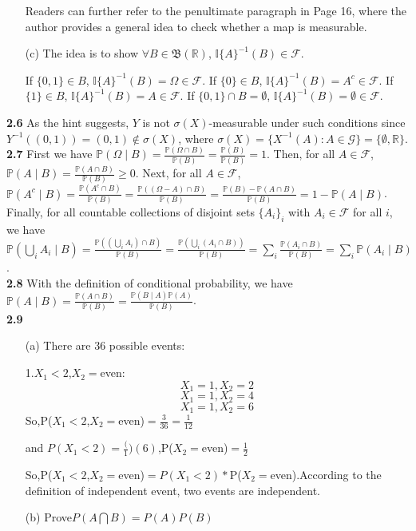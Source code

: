 \begin{enumerate}
    Readers can further refer to the penultimate paragraph in Page 16, where the author provides a general idea to check whether a map is measurable.

    \item[(c)] The idea is to show $\forall B \in \mathfrak{B}(\mathbb{R})$, $\mathbb{I}\{A\}^{-1}(B) \in \mathcal{F}$.

    If $\{0,1\} \in B$, $\mathbb{I}\{A\}^{-1}(B)=\Omega \in \mathcal{F}$. If $\{0\} \in B$, $\mathbb{I}\{A\}^{-1}(B)=A^c \in \mathcal{F}$. If $\{1\} \in B$, $\mathbb{I}\{A\}^{-1}(B)=A \in \mathcal{F}$. If $\{0,1\} \cap B = \emptyset$, $\mathbb{I}\{A\}^{-1}(B)=\emptyset \in \mathcal{F}$.
\end{enumerate}

\noindent\textbf{2.6}
As the hint suggests, $Y$ is not $\sigma(X)$-measurable under such conditions since $Y^{-1}((0, 1))=(0, 1) \notin \sigma(X)$, where $\sigma(X) = \{{X}^{-1}(A): A \in \mathcal{G}\} = \{\emptyset, \mathbb{R}\}$.\\

\noindent\textbf{2.7}
First we have $\mathbb{P}(\Omega \mid B) = \frac{\mathbb{P}(\Omega \cap B)}{\mathbb{P}(B)} = \frac{\mathbb{P}(B)}{\mathbb{P}(B)} = 1$. Then, for all $A \in \mathcal{F}$, $\mathbb{P}(A \mid B) = \frac{\mathbb{P}(A \cap B)}{\mathbb{P}(B)} \geq 0$. Next, for all $A \in \mathcal{F}$, $\mathbb{P}(A^c \mid B) = \frac{\mathbb{P}(A^c \cap B)}{\mathbb{P}(B)} = \frac{\mathbb{P}((\Omega - A) \cap B)}{\mathbb{P}(B)} = \frac{\mathbb{P}(B) - \mathbb{P}(A \cap B)}{\mathbb{P}(B)} = 1 - \mathbb{P}(A \mid B)$. Finally, for all countable collections of disjoint sets $\{A_i\}_i$ with $A_i \in \mathcal{F}$ for all $i$, we have $\mathbb{P}\left(\bigcup_{i} A_{i} \mid B\right) = \frac{\mathbb{P}((\bigcup_{i} A_{i}) \cap B)}{\mathbb{P}(B)} = \frac{\mathbb{P}(\bigcup_{i} (A_{i} \cap B))}{\mathbb{P}(B)} = \sum_{i} \frac{\mathbb{P}(A_{i} \cap B)}{\mathbb{P}(B)} = \sum_{i} \mathbb{P}(A_i \mid B)$. \\

\noindent\textbf{2.8}
With the definition of conditional probability, we have $\mathbb{P}(A \mid B) = \frac{\mathbb{P}(A \cap B)}{\mathbb{P}(B)} = \frac{\mathbb{P}(B \mid A) \mathbb{P}(A)}{\mathbb{P}(B)}$. \\

\noindent\textbf{2.9}

\begin{enumerate}
    \item[(a)]There are 36 possible events:

1.$X_1 < 2$,$X_2=$even:
$$X_1=1,X_2=2$$
$$X_1=1,X_2=4$$
$$X_1=1,X_2=6$$
So,P($X_1 < 2$,$X_2=$even)$=\frac{3}{36} = \frac{1}{12}$

and $P(X_1 < 2)=\frac(1)(6)$,P($X_2=$even)$=\frac{1}{2} $

So,P($X_1 < 2$,$X_2=$even)$=P(X_1 < 2)*$P($X_2=$even).According to the definition of independent event, two events are independent.

\item[(b)]Prove$P(A\bigcap B)=P(A)P(B)$
\end{enumerate}

